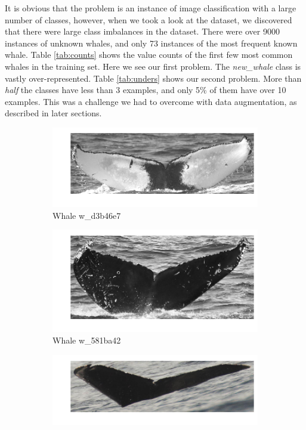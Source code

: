 It is obvious that the problem is an instance of image classification with a large number of classes, however, when we took a look at the dataset, we discovered that there were large class imbalances in the dataset. There were over 9000 instances of unknown whales, and only 73 instances of the most frequent known whale. Table \ref{tab:counts} shows the value counts of the first few most common whales in the training set. Here we see our first problem. The \textit{new\_whale} class is vastly over-represented. Table \ref{tab:unders} shows our second problem. More than \textit{half} the classes have less than 3 examples, and only 5\% of them have over 10 examples. This was a challenge we had to overcome with data augmentation, as described in later sections.\\

\begin{figure}[h!]
	\begin{subfigure}{.5\textwidth}
		\includegraphics[width=.7\linewidth]{images/w_d3b46e7.png}
		\caption{Whale w\_d3b46e7}
	\end{subfigure}
	\begin{subfigure}{.5\textwidth}
		\includegraphics[width=.7\linewidth]{images/w_581ba42.png}
		\caption{Whale w\_581ba42}
	\end{subfigure}
	\begin{subfigure}{.5\textwidth}
		\includegraphics[width=.7\linewidth]{images/new_whale.png}

\end{subfigure}
\end{figure}
